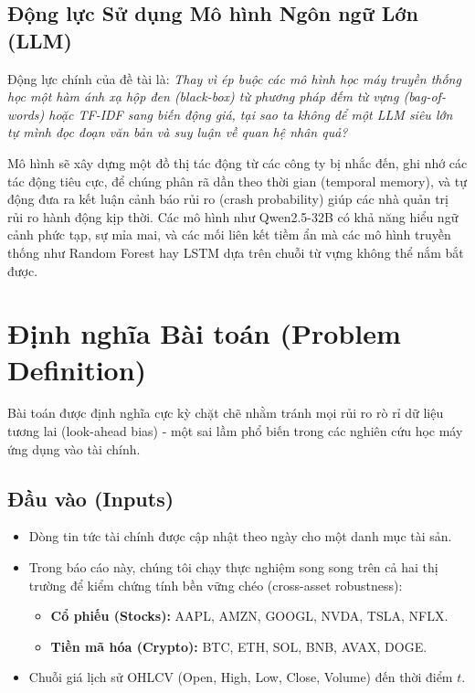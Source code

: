 \documentclass[11pt, a4paper]{article}
\begin{document}
\subsection{Động lực Sử dụng Mô hình Ngôn ngữ Lớn (LLM)}
Động lực chính của đề tài là: \textit{Thay vì ép buộc các mô hình học máy truyền thống học một hàm ánh xạ hộp đen (black-box) từ phương pháp đếm từ vựng (bag-of-words) hoặc TF-IDF sang biến động giá, tại sao ta không để một LLM siêu lớn tự mình đọc đoạn văn bản và suy luận về quan hệ nhân quả?} 

Mô hình sẽ xây dựng một đồ thị tác động từ các công ty bị nhắc đến, ghi nhớ các tác động tiêu cực, để chúng phân rã dần theo thời gian (temporal memory), và tự động đưa ra kết luận cảnh báo rủi ro (crash probability) giúp các nhà quản trị rủi ro hành động kịp thời. Các mô hình như Qwen2.5-32B có khả năng hiểu ngữ cảnh phức tạp, sự mỉa mai, và các mối liên kết tiềm ẩn mà các mô hình truyền thống như Random Forest hay LSTM dựa trên chuỗi từ vựng không thể nắm bắt được.

\section{Định nghĩa Bài toán (Problem Definition)}

Bài toán được định nghĩa cực kỳ chặt chẽ nhằm tránh mọi rủi ro rò rỉ dữ liệu tương lai (look-ahead bias) - một sai lầm phổ biến trong các nghiên cứu học máy ứng dụng vào tài chính.

\subsection{Đầu vào (Inputs)}
\begin{itemize}
    \item Dòng tin tức tài chính được cập nhật theo ngày cho một danh mục tài sản.
    \item Trong báo cáo này, chúng tôi chạy thực nghiệm song song trên cả hai thị trường để kiểm chứng tính bền vững chéo (cross-asset robustness):
    \begin{itemize}
        \item \textbf{Cổ phiếu (Stocks):} AAPL, AMZN, GOOGL, NVDA, TSLA, NFLX.
        \item \textbf{Tiền mã hóa (Crypto):} BTC, ETH, SOL, BNB, AVAX, DOGE.
    \end{itemize}
    \item Chuỗi giá lịch sử OHLCV (Open, High, Low, Close, Volume) đến thời điểm $t$.
\end{itemize}
\end{document}
